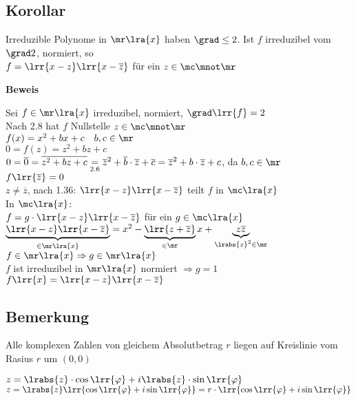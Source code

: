 \subsection{Korollar}
	Irreduzible Polynome in $\mr\lra{x}$ haben $\grad\leq 2$. Ist $f$ irreduzibel vom $\grad 2$, normiert, so \\
	$f=\lrr{x-z}\lrr{x-\overline{z}}$ für ein $z\in\mc\mnot\mr$
	
	\textbf{Beweis}
	
	Sei $f\in\mr\lra{x}$ irreduzibel, normiert, $\grad\lrr{f}=2$\\
	Nach 2.8 hat $f$ Nullstelle $z\in\mc\mnot\mr$\\
	$f(x)=x^2+bx+c\quad b,c\in\mr$\\
	$0=f(z)=z^2+bz+c$\\
	$0=\overline{0}=\overline{z^2+bz+c} \underset{\mbox{\scriptsize 2.6}}{=}\overline{z}^2+\overline{b}\cdot\overline{z}+\overline{c}=\overline{z}^2+b\cdot\overline{z}+c$, da $b,c\in\mr$\\
	$f\lrr{\overline{z}}=0$\\
	$z\neq\overline{z}$, nach 1.36: $\lrr{x-z}\lrr{x-\overline{z}}$ teilt $f$ in $\mc\lra{x}$\\
	In $\mc\lra{x}$:\\
	$f=g\cdot\lrr{x-z}\lrr{x-\overline{z}}$ für ein $g\in\mc\lra{x}$\\
	$\underbrace{\lrr{x-z}\lrr{x-\overline{z}}}_{\in\mr\lra{x}}=x^2-\underbrace{\lrr{z+\overline{z}}}_{\in\mr}x+\underbrace{z\overline{z}}_{\scriptstyle \lrabs{z}^2\in\mr}$\\
	$f\in\mr\lra{x}\Rightarrow g\in\mr\lra{x}$\\
	$f$ ist irreduzibel in $\mr\lra{x}$ normiert $\Rightarrow g=1$\\
	$f\lrr{x}=\lrr{x-z}\lrr{x-\overline{z}}$

\subsection{Bemerkung}
		\item Alle komplexen Zahlen von gleichem Absolutbetrag $r$ liegen auf Kreislinie vom Rasius $r$ um $(0,0)$
		
			$z=\lrabs{z}\cdot\cos\lrr{\varphi}+i\lrabs{z}\cdot\sin\lrr{\varphi}$\\
			$z=\lrabs{z}\lrr{\cos\lrr{\varphi}+i\sin\lrr{\varphi}}=r\cdot\lrr{\cos\lrr{\varphi}+i\sin\lrr{\varphi}}$
			
